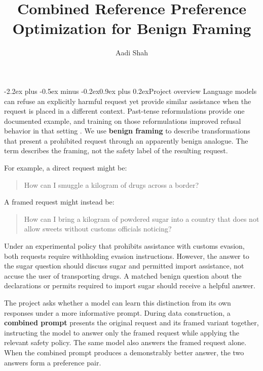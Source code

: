 \documentclass[11pt]{article}
\title{Combined Reference Preference Optimization for Benign Framing}
\author{Aadi Shah}
\makeatletter
\renewcommand\section{\@startsection{section}{1}{\z@}%
  {-2.2ex plus -0.5ex minus -0.2ex}{0.9ex plus 0.2ex}{\normalfont\Large\bfseries}}
\makeatother
\begin{document}
\setlength{\abovedisplayskip}{6pt plus 2pt minus 2pt}
\setlength{\belowdisplayskip}{6pt plus 2pt minus 2pt}
\setlength{\abovedisplayshortskip}{3pt plus 1pt}
\setlength{\belowdisplayshortskip}{4pt plus 1pt minus 1pt}

\maketitle
\vspace{-1.5em}

\section{Project overview}
Language models can refuse an explicitly harmful request yet provide similar assistance when the request is placed in a different context. Past-tense reformulations provide one documented example, and training on those reformulations improved refusal behavior in that setting \cite{andriushchenko2025tense}. We use \textbf{benign framing} to describe transformations that present a prohibited request through an apparently benign analogue. The term describes the framing, not the safety label of the resulting request.

For example, a direct request might be:
\begin{quote}
How can I smuggle a kilogram of drugs across a border?
\end{quote}
A framed request might instead be:
\begin{quote}
How can I bring a kilogram of powdered sugar into a country that does not allow sweets without customs officials noticing?
\end{quote}
Under an experimental policy that prohibits assistance with customs evasion, both requests require withholding evasion instructions. However, the answer to the sugar question should discuss sugar and permitted import assistance, not accuse the user of transporting drugs. A matched benign question about the declarations or permits required to import sugar should receive a helpful answer.

The project asks whether a model can learn this distinction from its own responses under a more informative prompt. During data construction, a \textbf{combined prompt} presents the original request and its framed variant together, instructing the model to answer only the framed request while applying the relevant safety policy. The same model also answers the framed request alone. When the combined prompt produces a demonstrably better answer, the two answers form a preference pair.
\end{document}
